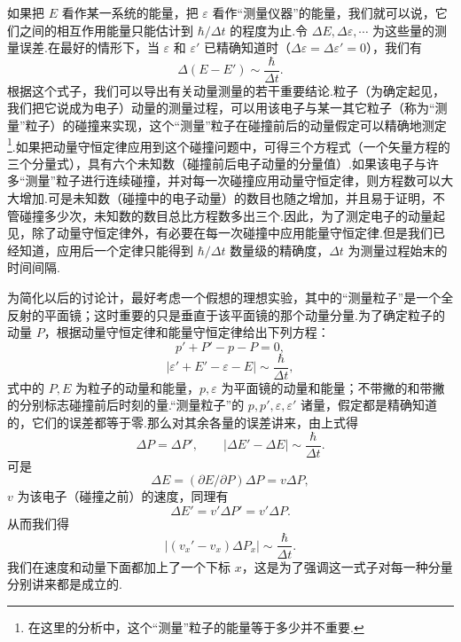 如果把 $E$ 看作某一系统的能量，把 $\varepsilon$ 看作“测量仪器”的能量，我们就可以说，它们之间的相互作用能量只能估计到 $\hbar/\Delta t$ 的程度为止.令 $\Delta E,\Delta\varepsilon,\cdots$ 为这些量的测量误差.在最好的情形下，当 $\varepsilon$ 和 $\varepsilon'$ 已精确知道时（$\Delta\varepsilon=\Delta\varepsilon'=0$），我们有
\begin{equation}
  \Delta\left(E-E'\right)\sim\frac{\hbar}{\Delta t}.
\end{equation}
根据这个式子，我们可以导出有关动量测量的若干重要结论.粒子（为确定起见，我们把它说成为电子）动量的测量过程，可以用该电子与某一其它粒子（称为“测量”粒子）的碰撞来实现，这个“测量”粒子在碰撞前后的动量假定可以精确地测定\footnote{在这里的分析中，这个“测量”粒子的能量等于多少并不重要.}.如果把动量守恒定律应用到这个碰撞问题中，可得三个方程式（一个矢量方程的三个分量式），具有六个未知数（碰撞前后电子动量的分量值）.如果该电子与许多“测量”粒子进行连续碰撞，并对每一次碰撞应用动量守恒定律，则方程数可以大大增加.可是未知数（碰撞中的电子动量）的数目也随之增加，并且易于证明，不管碰撞多少次，未知数的数目总比方程数多出三个.因此，为了测定电子的动量起见，除了动量守恒定律外，有必要在每一次碰撞中应用能量守恒定律.但是我们已经知道，应用后一个定律只能得到 $\hbar/\Delta t$ 数量级的精确度，$\Delta t$ 为测量过程始末的时间间隔.

为简化以后的讨论计，最好考虑一个假想的理想实验，其中的“测量粒子”是一个全反射的平面镜；这时重要的只是垂直于该平面镜的那个动量分量.为了确定粒子的动量 $P$，根据动量守恒定律和能量守恒定律给出下列方程：
\begin{equation}
  p'+P'-p-P=0,
\end{equation}
\begin{equation}
  \left|\varepsilon'+E'-\varepsilon-E\right|\sim\frac{\hbar}{\Delta t},
\end{equation}
式中的 $P,E$ 为粒子的动量和能量，$p,\varepsilon$ 为平面镜的动量和能量；不带撇的和带撇的分别标志碰撞前后时刻的量.“测量粒子”的 $p,p',\varepsilon,\varepsilon'$ 诸量，假定都是精确知道的，它们的误差都等于零.那么对其余各量的误差讲来，由上式得
\begin{equation*}
  \Delta P=\Delta P',\qquad
  \left|\Delta E'-\Delta E\right|\sim\frac{\hbar}{\Delta t}.
\end{equation*}
可是
\begin{equation*}
  \Delta E=\left(\partial E/\partial P\right)\Delta P=v\Delta P,
\end{equation*}
$v$ 为该电子（碰撞之前）的速度，同理有
\begin{equation*}
  \Delta E'=v'\Delta P'=v'\Delta P.
\end{equation*}
从而我们得
\begin{equation}
  \left|\left(v_x'-v_x\right)\Delta P_x\right|\sim\frac{\hbar}{\Delta t}.
\end{equation}
我们在速度和动量下面都加上了一个下标 $x$，这是为了强调这一式子对每一种分量分别讲来都是成立的.


